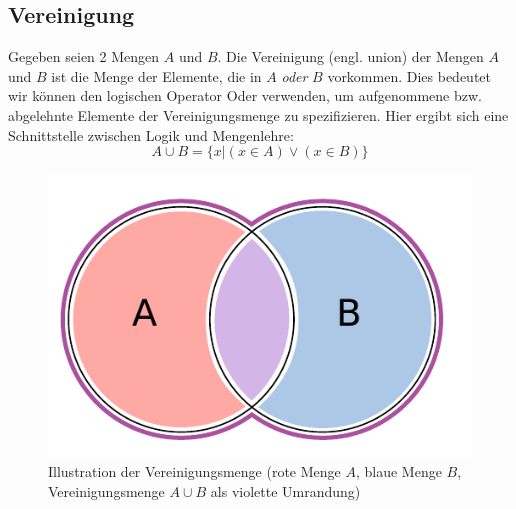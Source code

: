 \subsection{Vereinigung}
%
Gegeben seien 2 Mengen $A$ und $B$. Die Vereinigung (engl. union) der Mengen
$A$ und $B$ ist die Menge der Elemente, die in $A$ \emph{oder} $B$ vorkommen.
Dies bedeutet wir können den logischen Operator Oder verwenden, um aufgenommene
bzw. abgelehnte Elemente der Vereinigungsmenge zu spezifizieren. Hier ergibt
sich eine Schnittstelle zwischen Logik und Mengenlehre:
%
\[
    A \cup B = \{x | (x \in A) \lor (x \in B)\}
\]
%
\begin{figure}[p]
 \begin{center}
  \includegraphics{img/union.pdf}
  \caption{Illustration der Vereinigungsmenge (rote Menge $A$, blaue Menge $B$,
        Vereinigungsmenge $A \cup B$ als violette Umrandung)}
  \label{fig:union}
 \end{center}
\end{figure}

